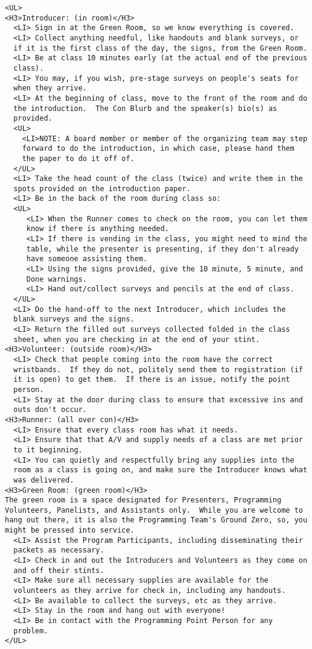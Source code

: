 \documentclass[tablesignature]{scrartcl}
\begin{document}
\begin{verbatim}
<UL>
<H3>Introducer: (in room)</H3>
  <LI> Sign in at the Green Room, so we know everything is covered.
  <LI> Collect anything needful, like handouts and blank surveys, or
  if it is the first class of the day, the signs, from the Green Room.
  <LI> Be at class 10 minutes early (at the actual end of the previous
  class).
  <LI> You may, if you wish, pre-stage surveys on people's seats for
  when they arrive.
  <LI> At the beginning of class, move to the front of the room and do
  the introduction.  The Con Blurb and the speaker(s) bio(s) as
  provided.
  <UL>
    <LI>NOTE: A board member or member of the organizing team may step
    forward to do the introduction, in which case, please hand them
    the paper to do it off of.
  </UL>
  <LI> Take the head count of the class (twice) and write them in the
  spots provided on the introduction paper.
  <LI> Be in the back of the room during class so:
  <UL>
     <LI> When the Runner comes to check on the room, you can let them
     know if there is anything needed.
     <LI> If there is vending in the class, you might need to mind the
     table, while the presenter is presenting, if they don't already
     have someone assisting them.
     <LI> Using the signs provided, give the 10 minute, 5 minute, and
     Done warnings.
     <LI> Hand out/collect surveys and pencils at the end of class.
  </UL>
  <LI> Do the hand-off to the next Introducer, which includes the
  blank surveys and the signs.
  <LI> Return the filled out surveys collected folded in the class
  sheet, when you are checking in at the end of your stint.
<H3>Volunteer: (outside room)</H3>
  <LI> Check that people coming into the room have the correct
  wristbands.  If they do not, politely send them to registration (if
  it is open) to get them.  If there is an issue, notify the point
  person.
  <LI> Stay at the door during class to ensure that excessive ins and
  outs don't occur.
<H3>Runner: (all over con)</H3>
  <LI> Ensure that every class room has what it needs.
  <LI> Ensure that that A/V and supply needs of a class are met prior
  to it beginning.
  <LI> You can quietly and respectfully bring any supplies into the
  room as a class is going on, and make sure the Introducer knows what
  was delivered.
<H3>Green Room: (green room)</H3>
The green room is a space designated for Presenters, Programming
Volunteers, Panelists, and Assistants only.  While you are welcome to
hang out there, it is also the Programming Team's Ground Zero, so, you
might be pressed into service.
  <LI> Assist the Program Participants, including disseminating their
  packets as necessary.
  <LI> Check in and out the Introducers and Volunteers as they come on
  and off their stints.
  <LI> Make sure all necessary supplies are available for the
  volunteers as they arrive for check in, including any handouts.
  <LI> Be available to collect the surveys, etc as they arrive.
  <LI> Stay in the room and hang out with everyone!
  <LI> Be in contact with the Programming Point Person for any
  problem.
</UL>
\end{verbatim}
\end{document}
